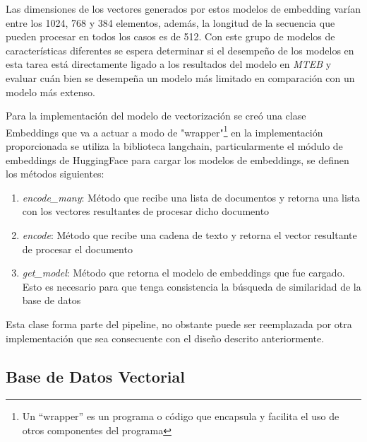         Las dimensiones de los vectores generados por estos modelos de embedding varían entre los 1024, 768 y 384 elementos, además, la longitud de la secuencia que pueden procesar en todos los casos es de 512. Con este grupo de modelos de características diferentes se espera determinar si el desempeño de los modelos en esta tarea está directamente ligado a los resultados del modelo en \emph{MTEB} y evaluar cuán bien se desempeña un modelo más limitado en comparación con un modelo más extenso.

    Para la implementación del modelo de vectorización se creó una clase Embeddings que va a actuar a modo de "wrapper"\footnote{Un “wrapper” es un programa o código que encapsula y facilita el uso de otros componentes del programa} en la implementación proporcionada se utiliza la biblioteca langchain, particularmente el módulo de embeddings de HuggingFace para cargar los modelos de embeddings, se definen los métodos siguientes:
    \begin{enumerate}
        \item \emph{encode\_many}: Método que recibe una lista de documentos y retorna una lista con los vectores resultantes de procesar dicho documento
        \item \emph{encode}: Método que recibe una cadena de texto y retorna el vector resultante de procesar el documento 
        \item \emph{get\_model}: Método que retorna el modelo de embeddings que fue cargado. Esto es necesario para que tenga consistencia la búsqueda de similaridad de la base de datos
    \end{enumerate}

    Esta clase forma parte del pipeline, no obstante puede ser reemplazada por otra implementación que sea consecuente con el diseño descrito anteriormente.

    \subsection{Base de Datos Vectorial}

